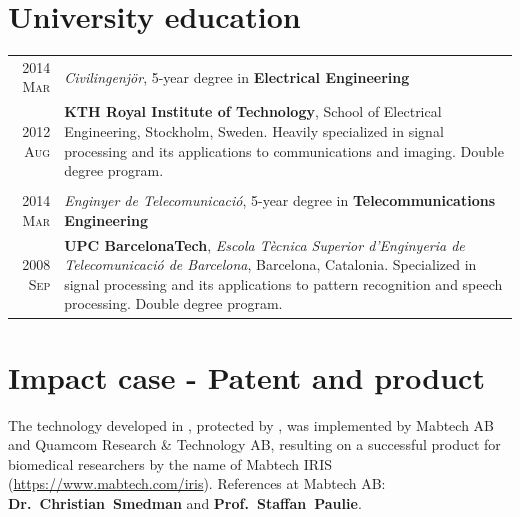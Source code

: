 \documentclass[a4paper,10pt]{article}
\begin{document}

  \section{University education}

    \begin{tabular}{r|p{13cm}}	
    
      \textsc{2014 Mar}  & \emph{Civilingenj\"{o}r}, 5-year degree in \textbf{Electrical Engineering} \\
      \textsc{2012 Aug}  & \footnotesize{\textbf{KTH Royal Institute of Technology}, School of Electrical Engineering, Stockholm, Sweden. 
			   Heavily specialized in signal processing and its applications to communications and imaging. Double degree program.} \\ 
      \multicolumn{2}{c}{} \\

      
      \textsc{2014 Mar}  & \emph{Enginyer de Telecomunicaci\'{o}}, 5-year degree in \textbf{Telecommunications Engineering} \\  
      \textsc{2008 Sep}  & \footnotesize{\textbf{UPC BarcelonaTech}, \emph{Escola T\`{e}cnica Superior
			   d'Enginyeria de Telecomunicaci\'{o} de Barcelona}, Barcelona, Catalonia. 
			   Specialized in signal processing and its applications to pattern recognition and speech processing. Double degree program.} \\
    \end{tabular}

  \begin{bibunit}
    \renewcommand\refname{Publications}
    \nocite{AguilaPla2019b,AguilaPla2019a,AguilaPla2019,AguilaPla2017,AguilaPla2017a,AguilaPla2018,AguilaPla2018a,AguilaPla2014}
    \footnotesize{
    }
   
    \section{Impact case - Patent and product}
        
        The technology developed in \cite{AguilaPla2017,AguilaPla2017a}, protected by \cite{Mabtech2017},
        was implemented by Mabtech AB and Quamcom Research \& Technology AB, resulting on a successful product
        for biomedical researchers by the name of Mabtech IRIS (\url{https://www.mabtech.com/iris}).
        References at Mabtech AB: \textbf{Dr.~Christian~Smedman} and \textbf{Prof.~Staffan~Paulie}.
    
  \end{bibunit}
  
\end{document}
